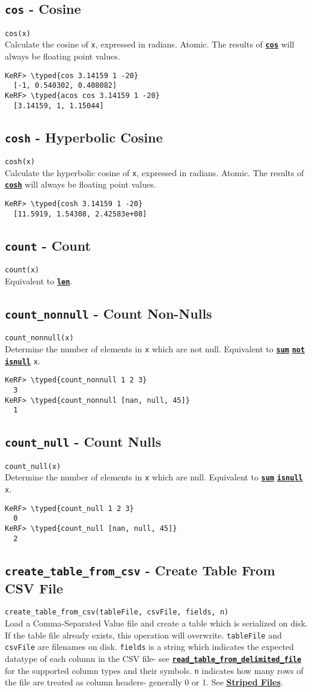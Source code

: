 \documentclass{article}
\newcommand{\typed}[1]{\textcolor{TealBlue}{#1}}
\newcommand{\primdefu}[3]{\subsection{\texttt{#1} - #2}\label{prim:#3}}
\newcommand{\primu}[2]{\hyperref[prim:#2]{\textbf{\texttt{#1}}}}
\newcommand{\primdef}[2]{\primdefu{#1}{#2}{#1}}
\newcommand{\prim}[1]{\primu{#1}{#1}}
\begin{document}
\pagebreak
\primdef{cos}{Cosine}
\texttt{cos(x)}\\

Calculate the cosine of \texttt{x}, expressed in radians. Atomic. The results of \prim{cos} will always be floating point values.
\begin{Verbatim}
KeRF> \typed{cos 3.14159 1 -20}
  [-1, 0.540302, 0.408082]
KeRF> \typed{acos cos 3.14159 1 -20}
  [3.14159, 1, 1.15044]
\end{Verbatim}

\primdef{cosh}{Hyperbolic Cosine}
\texttt{cosh(x)}\\

Calculate the hyperbolic cosine of \texttt{x}, expressed in radians. Atomic. The results of \prim{cosh} will always be floating point values.
\begin{Verbatim}
KeRF> \typed{cosh 3.14159 1 -20}
  [11.5919, 1.54308, 2.42583e+08]
\end{Verbatim}

\primdef{count}{Count}
\texttt{count(x)}\\

Equivalent to \prim{len}.

\primdefu{count\_nonnull}{Count Non-Nulls}{countNonnull}
\texttt{count\_nonnull(x)}\\

Determine the number of elements in \texttt{x} which are not null. Equivalent to \prim{sum} \prim{not} \prim{isnull} \texttt{x}.
\begin{Verbatim}
KeRF> \typed{count_nonnull 1 2 3}
  3
KeRF> \typed{count_nonnull [nan, null, 45]}
  1
\end{Verbatim}

\primdefu{count\_null}{Count Nulls}{countNull}
\texttt{count\_null(x)}\\

Determine the number of elements in \texttt{x} which are null. Equivalent to \prim{sum} \prim{isnull} \texttt{x}.
\begin{Verbatim}
KeRF> \typed{count_null 1 2 3}
  0
KeRF> \typed{count_null [nan, null, 45]}
  2
\end{Verbatim}

\pagebreak
\primdefu{create\_table\_from\_csv}{Create Table From CSV File}{createTableFromCsv}
\texttt{create\_table\_from\_csv(tableFile, csvFile, fields, n)}\\

Load a Comma-Separated Value file and create a table which is serialized on disk. If the table file already exists, this operation will overwrite. \texttt{tableFile} and \texttt{csvFile} are filenames on disk. \texttt{fields} is a string which indicates the expected datatype of each column in the CSV file- see \primu{read\_table\_from\_delimited\_file}{readTableFromDelimitedFile} for the supported column types and their symbols. \texttt{n} indicates how many rows of the file are treated as column headers- generally 0 or 1. See \hyperref[sec:stripeio]{\textbf{Striped Files}}.
\end{document}
